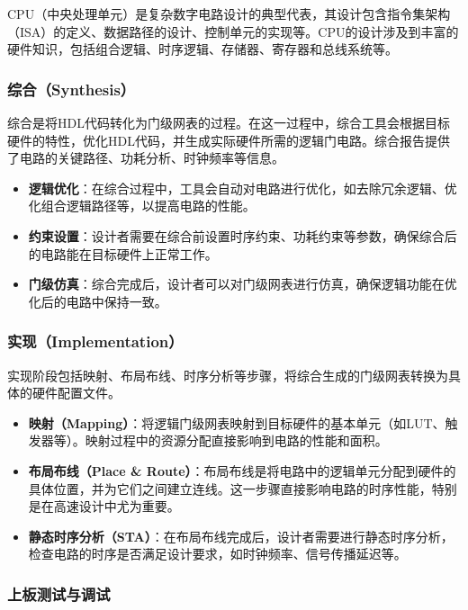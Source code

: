 CPU（中央处理单元）是复杂数字电路设计的典型代表，其设计包含指令集架构（ISA）的定义、数据路径的设计、控制单元的实现等。CPU的设计涉及到丰富的硬件知识，包括组合逻辑、时序逻辑、存储器、寄存器和总线系统等。

\subsubsection{综合（Synthesis）}\label{sec:03-digital-logic-029}

综合是将HDL代码转化为门级网表的过程。在这一过程中，综合工具会根据目标硬件的特性，优化HDL代码，并生成实际硬件所需的逻辑门电路。综合报告提供了电路的关键路径、功耗分析、时钟频率等信息。

\begin{itemize}
\tightlist
\item
  \textbf{逻辑优化}：在综合过程中，工具会自动对电路进行优化，如去除冗余逻辑、优化组合逻辑路径等，以提高电路的性能。
\item
  \textbf{约束设置}：设计者需要在综合前设置时序约束、功耗约束等参数，确保综合后的电路能在目标硬件上正常工作。
\item
  \textbf{门级仿真}：综合完成后，设计者可以对门级网表进行仿真，确保逻辑功能在优化后的电路中保持一致。
\end{itemize}

\subsubsection{实现（Implementation）}\label{sec:03-digital-logic-030}

实现阶段包括映射、布局布线、时序分析等步骤，将综合生成的门级网表转换为具体的硬件配置文件。

\begin{itemize}
\tightlist
\item
  \textbf{映射（Mapping）}：将逻辑门级网表映射到目标硬件的基本单元（如LUT、触发器等）。映射过程中的资源分配直接影响到电路的性能和面积。
\item
  \textbf{布局布线（Place \& Route）}：布局布线是将电路中的逻辑单元分配到硬件的具体位置，并为它们之间建立连线。这一步骤直接影响电路的时序性能，特别是在高速设计中尤为重要。
\item
  \textbf{静态时序分析（STA）}：在布局布线完成后，设计者需要进行静态时序分析，检查电路的时序是否满足设计要求，如时钟频率、信号传播延迟等。
\end{itemize}

\subsubsection{上板测试与调试}\label{sec:03-digital-logic-031}

